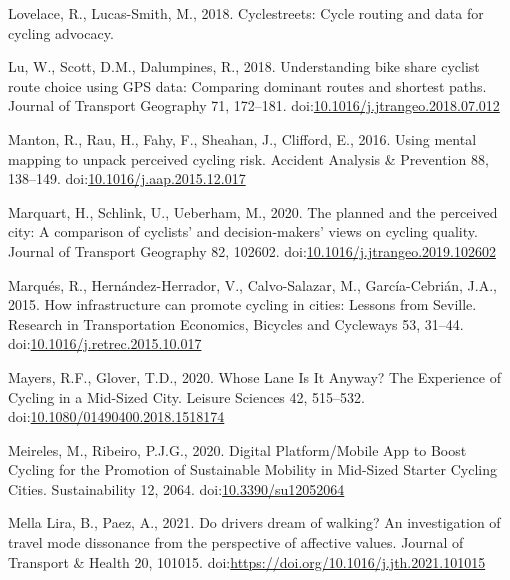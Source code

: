\documentclass[]{elsarticle} %
\begin{document}
\leavevmode\hypertarget{ref-Lovelace2018}{}%
Lovelace, R., Lucas-Smith, M., 2018. Cyclestreets: Cycle routing and
data for cycling advocacy.

\leavevmode\hypertarget{ref-luUnderstandingBikeShare2018}{}%
Lu, W., Scott, D.M., Dalumpines, R., 2018. Understanding bike share
cyclist route choice using GPS data: Comparing dominant routes and
shortest paths. Journal of Transport Geography 71, 172--181.
doi:\href{https://doi.org/10.1016/j.jtrangeo.2018.07.012}{10.1016/j.jtrangeo.2018.07.012}

\leavevmode\hypertarget{ref-mantonUsingMentalMapping2016}{}%
Manton, R., Rau, H., Fahy, F., Sheahan, J., Clifford, E., 2016. Using
mental mapping to unpack perceived cycling risk. Accident Analysis \&
Prevention 88, 138--149.
doi:\href{https://doi.org/10.1016/j.aap.2015.12.017}{10.1016/j.aap.2015.12.017}

\leavevmode\hypertarget{ref-marquartPlannedPerceivedCity2020}{}%
Marquart, H., Schlink, U., Ueberham, M., 2020. The planned and the
perceived city: A comparison of cyclists' and decision-makers' views on
cycling quality. Journal of Transport Geography 82, 102602.
doi:\href{https://doi.org/10.1016/j.jtrangeo.2019.102602}{10.1016/j.jtrangeo.2019.102602}

\leavevmode\hypertarget{ref-marquesHowInfrastructureCan2015a}{}%
Marqués, R., Hernández-Herrador, V., Calvo-Salazar, M., García-Cebrián,
J.A., 2015. How infrastructure can promote cycling in cities: Lessons
from Seville. Research in Transportation Economics, Bicycles and
Cycleways 53, 31--44.
doi:\href{https://doi.org/10.1016/j.retrec.2015.10.017}{10.1016/j.retrec.2015.10.017}

\leavevmode\hypertarget{ref-mayersWhoseLaneIt2020}{}%
Mayers, R.F., Glover, T.D., 2020. Whose Lane Is It Anyway? The
Experience of Cycling in a Mid-Sized City. Leisure Sciences 42,
515--532.
doi:\href{https://doi.org/10.1080/01490400.2018.1518174}{10.1080/01490400.2018.1518174}

\leavevmode\hypertarget{ref-meirelesDigitalPlatformMobile2020}{}%
Meireles, M., Ribeiro, P.J.G., 2020. Digital Platform/Mobile App to
Boost Cycling for the Promotion of Sustainable Mobility in Mid-Sized
Starter Cycling Cities. Sustainability 12, 2064.
doi:\href{https://doi.org/10.3390/su12052064}{10.3390/su12052064}

\leavevmode\hypertarget{ref-mellaDoDrivers2021}{}%
Mella Lira, B., Paez, A., 2021. Do drivers dream of walking? An
investigation of travel mode dissonance from the perspective of
affective values. Journal of Transport \& Health 20, 101015.
doi:\href{https://doi.org/https://doi.org/10.1016/j.jth.2021.101015}{https://doi.org/10.1016/j.jth.2021.101015}
\end{document}
